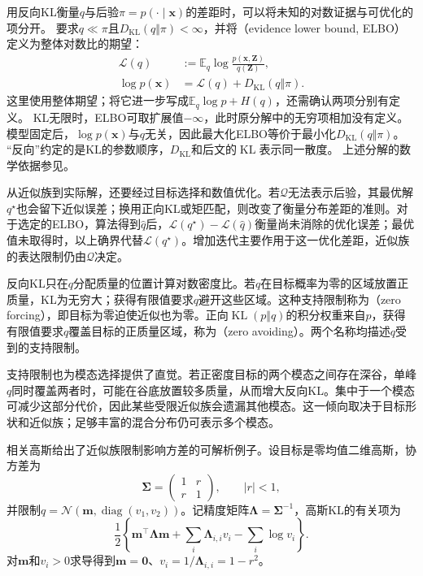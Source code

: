 用反向KL衡量$q$与后验$\pi=p(\cdot\mid\bm x)$的差距时，可以将未知的对数证据与可优化的项分开。
要求$q\ll\pi$且$D_{\mathrm{KL}}(q\Vert\pi)<\infty$，并将（evidence lower bound, ELBO）定义为整体对数比的期望：
\begin{equation}
  \begin{aligned}
    \mathcal L(q)
      &:=\mathbb E_q\log\frac{p(\bm x,\bm Z)}{q(\bm Z)},\\
    \log p(\bm{x})
      &=\mathcal L(q)+D_{\mathrm{KL}}(q\Vert\pi).
  \end{aligned}
  \label{eq:pgm-variational-elbo}
\end{equation}
这里使用整体期望；将它进一步写成$\mathbb E_q\log p+H(q)$，还需确认两项分别有定义。
KL无限时，ELBO可取扩展值$-\infty$，此时原分解中的无穷项相加没有定义。
模型固定后，$\log p(\bm x)$与$q$无关，因此最大化ELBO等价于最小化$D_{\mathrm{KL}}(q\Vert\pi)$。
“反向”约定的是KL的参数顺序，$D_{\mathrm{KL}}$和后文的$\operatorname{KL}$表示同一散度。
上述分解的数学依据参见。

从近似族到实际解，还要经过目标选择和数值优化。若$\mathcal Q$无法表示后验，其最优解$q^\star$也会留下近似误差；换用正向KL或矩匹配，则改变了衡量分布差距的准则。对于选定的ELBO，算法得到$\widehat q$后，$\mathcal L(q^\star)-\mathcal L(\widehat q)$衡量尚未消除的优化误差；最优值未取得时，以上确界代替$\mathcal L(q^\star)$。增加迭代主要作用于这一优化差距，近似族的表达限制仍由$\mathcal Q$决定。

反向KL只在$q$分配质量的位置计算对数密度比。若$q$在目标概率为零的区域放置正质量，KL为无穷大；获得有限值要求$q$避开这些区域。这种支持限制称为（zero forcing），即目标为零迫使近似也为零。正向$\operatorname{KL}(p\Vert q)$的积分权重来自$p$，获得有限值要求$q$覆盖目标的正质量区域，称为（zero avoiding）。两个名称均描述$q$受到的支持限制。

支持限制也为模态选择提供了直觉。若正密度目标的两个模态之间存在深谷，单峰$q$同时覆盖两者时，可能在谷底放置较多质量，从而增大反向KL。集中于一个模态可减少这部分代价，因此某些受限近似族会遗漏其他模态。这一倾向取决于目标形状和近似族；足够丰富的混合分布仍可表示多个模态。

相关高斯给出了近似族限制影响方差的可解析例子。设目标是零均值二维高斯，协方差为
\[
  \bm{\Sigma}=
  \begin{pmatrix}1&r\\r&1\end{pmatrix},
  \qquad |r|<1,
\]
并限制$q=\mathcal N(\bm{m},\operatorname{diag}(v_1,v_2))$。记精度矩阵$\bm{\Lambda}=\bm{\Sigma}^{-1}$，高斯KL的有关项为
\[
  \frac12\left\{\bm{m}^{\top}\bm{\Lambda}\bm{m}
     +\sum_i\bm{\Lambda}_{i,i}v_i-\sum_i\log v_i\right\}.
\]
对$\bm{m}$和$v_i>0$求导得到$\bm{m}=\bm{0}$、$v_i=1/\bm{\Lambda}_{i,i}=1-r^2$。

